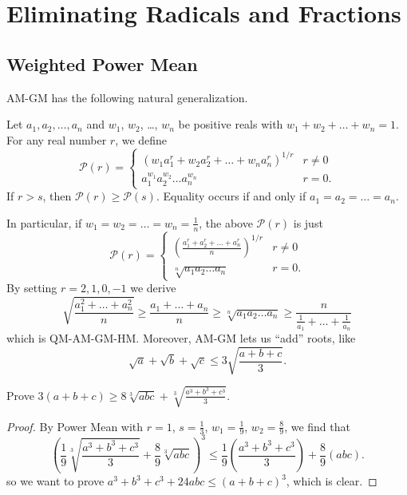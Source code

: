 \documentclass[11pt]{scrartcl}
\begin{document}
\section{Eliminating Radicals and Fractions}
\subsection{Weighted Power Mean}
AM-GM has the following natural generalization.
\begin{theorem}
   Let $a_1, a_2, \dots, a_n$ and $w_1$, $w_2$, \dots, $w_n$  be positive reals with $w_1+w_2+\dots+w_n=1$.
  For any real number $r$, we define
  \[ \mathcal P(r) =
    \begin{cases}
      \left( w_1 a_1^r + w_2 a_2^r + \dots + w_n a_n^r \right)^{1/r} & r \neq 0 \\[1em]
      a_1^{w_1} a_2^{w_2} \dots a_n^{w_n} & r = 0.
    \end{cases}
  \]
  If $r>s$, then $\mathcal P(r) \ge \mathcal P(s)$.
  Equality occurs if and only if $a_1 = a_2 = \dots = a_n$.
\end{theorem}
In particular, if $w_1 = w_2 = \dots = w_n = \frac 1n$, the above $\mathcal P(r)$ is just
  \[ \mathcal P(r) =
    \begin{cases}
      \left( \displaystyle\frac{a_1^r + a_2^r + \dots + a_n^r}{n} \right)^{1/r} & r \neq 0 \\[1.5em]
      \sqrt[n]{a_1a_2 \dots a_n} & r = 0.
    \end{cases}
  \]
By setting $r=2,1,0,-1$ we derive
\[ \sqrt{\frac{a_1^2+\dots+a_n^2}{n}}
  \ge \frac{a_1+\dots+a_n}{n}
  \ge \sqrt[n]{a_1a_2 \dots a_n}
  \ge \frac{n}{\frac{1}{a_1} + \dots + \frac{1}{a_n}} \]
which is QM-AM-GM-HM. Moreover, AM-GM lets us ``add'' roots, like
\[ \sqrt a + \sqrt b + \sqrt c \le 3\sqrt{\frac{a+b+c}{3}}. \]

\begin{example}
   Prove $3(a+b+c) \ge 8\sqrt[3]{abc} + \sqrt[3]{\frac{a^3+b^3+c^3}{3}}$.
\end{example}
\begin{proof}
  By Power Mean with $r=1$, $s=\frac 13$, $w_1 = \frac 19$, $w_2 = \frac 89$, we find that
  \[ \left( \frac 19 \sqrt[3]{\frac{a^3+b^3+c^3}{3}} + \frac 89 \sqrt[3]{abc} \right)^3
  \le \frac19 \left( \frac{a^3+b^3+c^3}{3} \right) + \frac 89 \left( abc \right). \]
  so we want to prove $a^3+b^3+c^3+24abc \le (a+b+c)^3$, which is clear.
\end{proof}
\end{document}
